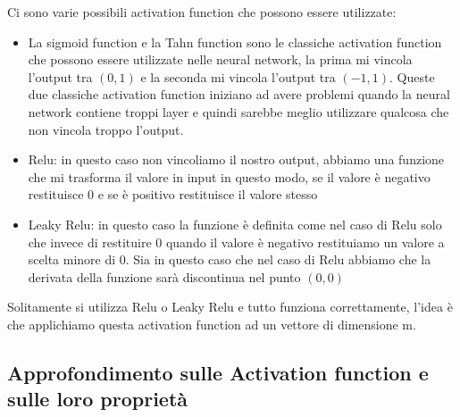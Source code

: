 \documentclass[14pt]{extreport}
\begin{document}
Ci sono varie possibili activation function che possono essere utilizzate:
\begin{itemize}
\item La sigmoid function e la Tahn function sono le classiche activation function che possono essere utilizzate nelle neural network, la prima mi
vincola l'output tra $(0,1)$ e la seconda mi vincola l'output tra $(-1,1)$. Queste due classiche activation function iniziano ad avere problemi quando
la neural network contiene troppi layer e quindi sarebbe meglio utilizzare qualcosa che non vincola troppo l'output.
\item Relu: in questo caso non vincoliamo il nostro output, abbiamo una funzione che mi trasforma il valore in input in questo modo, se il valore è
negativo restituisce 0 e se è positivo restituisce il valore stesso
\item Leaky Relu: in questo caso la funzione è definita come nel caso di Relu solo che invece di restituire 0 quando il valore è negativo restituiamo
un valore a scelta minore di 0. Sia in questo caso che nel caso di Relu abbiamo che la derivata della funzione sarà discontinua nel punto $(0,0)$
\end{itemize}

Solitamente si utilizza Relu o Leaky Relu e tutto funziona correttamente, l'idea è che applichiamo questa activation function ad un vettore di
dimensione m.

\subsection{Approfondimento sulle Activation function e sulle loro proprietà}
\end{document}
